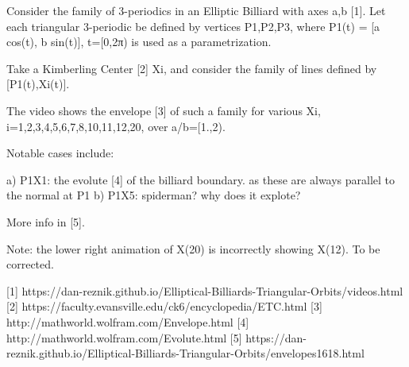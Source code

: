 Consider the family of 3-periodics in an Elliptic Billiard with axes a,b [1]. Let each triangular 3-periodic be defined by vertices P1,P2,P3, where P1(t) = [a cos(t), b sin(t)], t=[0,2π) is used as a parametrization. 

Take a Kimberling Center [2] Xi, and consider the family of lines defined by [P1(t),Xi(t)].

The video shows the envelope [3] of such a family for various Xi, i=1,2,3,4,5,6,7,8,10,11,12,20, over a/b=[1.,2).

Notable cases include:

a) P1X1: the evolute [4] of the billiard boundary. as these are always parallel to the normal at P1
b) P1X5: spiderman? why does it explote?

More info in [5].

Note: the lower right animation of X(20) is incorrectly showing X(12). To be corrected.

[1] https://dan-reznik.github.io/Elliptical-Billiards-Triangular-Orbits/videos.html
[2] https://faculty.evansville.edu/ck6/encyclopedia/ETC.html
[3] http://mathworld.wolfram.com/Envelope.html
[4] http://mathworld.wolfram.com/Evolute.html
[5] https://dan-reznik.github.io/Elliptical-Billiards-Triangular-Orbits/envelopes1618.html